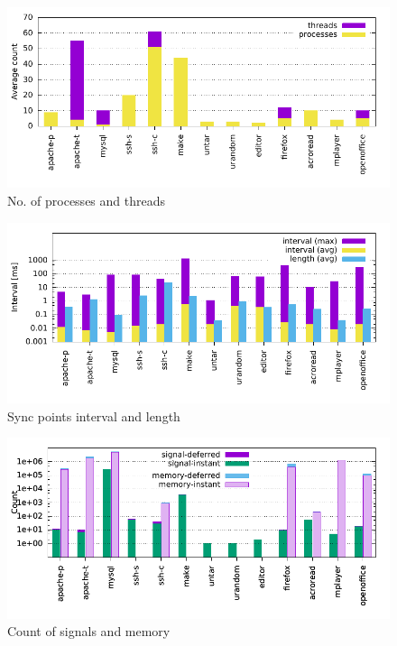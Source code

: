 \begin{figure}[t]
    \centering
    \includegraphics[width=\linewidth]{figures/scribe/totals}
  \vspace{-5em}
    \caption{No. of processes and threads}
    \label{scribe:fig:totals}
\end{figure}

\begin{figure}[t]
    \centering
    \includegraphics[width=\linewidth]{figures/scribe/syncpts2}
  \vspace{-5em}
    \caption{Sync points interval and length}
    \label{scribe:fig:syncpts}
\end{figure}

\begin{figure}[t]
    \centering
    \includegraphics[width=\linewidth]{figures/scribe/stats}
  \vspace{-5em}
    \caption{Count of signals and memory}
    \label{scribe:fig:stats}
\end{figure}

